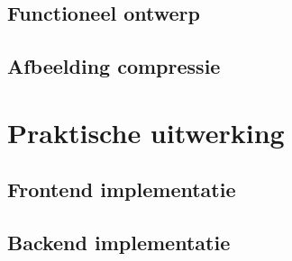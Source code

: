 \newpage
\section{Functioneel ontwerp}

\newpage
\section{Afbeelding compressie}

\chapter{Praktische uitwerking}
\vspace{-3cm}
\section{Frontend implementatie}
\section{Backend implementatie}


%
%
